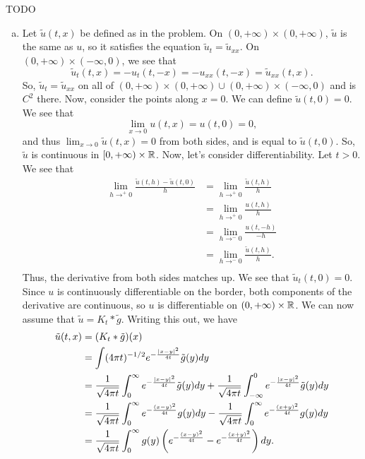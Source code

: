 \documentclass{article}
\begin{document}
\newpage
{} TODO
 \tri
\hop 
\solution
\newcommand{\tu}{\tilde{u}}
\begin{enumerate}[(a)]
    \item Let $\tilde{u}(t,x)$ be defined as in the problem. On $(0, +\infty) \times (0, +\infty)$, $\tilde{u}$ is the same as $u$, so it satisfies the equation $\tu_t = \tu_{xx}$. On $(0, +\infty) \times (-\infty, 0)$, we see that 
    \[\tu_t(t,x) = -u_t(t, -x) = -u_{xx}(t, -x) = \tu_{xx}(t,x).\]
    So, $\tu_t = \tu_{xx}$ on all of  $(0, +\infty) \times (0, +\infty)  \cup (0, +\infty) \times (-\infty, 0)$ and is $C^2$ there. Now, consider the points along $x=0$. We can define $\tu(t,0)= 0$. We see that 
    \[\lim_{x \to 0} u(t,x) = u(t,0) = 0,\]
    and thus $\lim_{x \to 0} \tu(t,x) = 0$ from both sides, and is equal to $\tu(t,0)$. So, $\tu$ is continuous in $[0,+\infty)\times \mathbb{R}$. 
    \hop 
    Now, let's consider differentiability. Let $t > 0$. We see that 
    \begin{align*}
        \lim_{h\to^+ 0} \frac{\tu(t,h)- \tu(t,0)}{h} &=  \lim_{h\to^+ 0} \frac{\tu(t,h)}{h} \\
        &= \lim_{h\to^+ 0} \frac{u(t,h)}{h}\\
        &= \lim_{h\to^- 0} \frac{u(t,-h)}{-h}\\
        &= \lim_{h\to^- 0} \frac{\tu(t,h)}{h}.\\
    \end{align*}
    Thus, the derivative from both sides matches up. We see that $\tu_t(t,0) = 0$. Since $u$ is continuously differentiable on the border, both components of the derivative are continuous, so $u$ is differentiable on $(0, +\infty) \times \mathbb{R}$. 
    \hop 
    We can now assume that $\tu = K_t * \tilde{g}$. Writing this out, we have 
    \begin{align*}
        \tu(t,x) &= (K_t * \tilde{g})(x)\\
        &= \int(4\pi t)^{-1/2} e^{-\frac{|x-y|^2}{4t}} \tilde{g}(y)dy\\
        &=  \frac{1}{\sqrt{4\pi t}}\int_{0}^\infty  e^{-\frac{|x-y|^2}{4t}} \tilde{g}(y)dy+ \frac{1}{\sqrt{4\pi t}}\int_{-\infty}^0  e^{-\frac{|x-y|^2}{4t}} \tilde{g}(y)dy\\
        &=  \frac{1}{\sqrt{4\pi t}}\int_{0}^\infty  e^{-\frac{(x-y)^2}{4t}} g(y)dy- \frac{1}{\sqrt{4\pi t}}\int_{0}^\infty  e^{-\frac{(x+y)^2}{4t}} g(y)dy\\
        &=  \frac{1}{\sqrt{4\pi t}}\int_{0}^\infty  g(y)\del{ e^{-\frac{(x-y)^2}{4t}} - e^{-\frac{(x+y)^2}{4t}}}dy.\\

\end{align*}
\end{enumerate}
\end{document}
